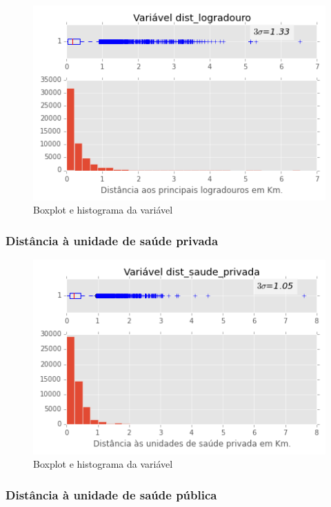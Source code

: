 \begin{figure}[H]
	\centering
	\includegraphics[width=0.8\linewidth]{img/var_dist_logradouro_boxhist}
	\caption{Boxplot e histograma da variável }
	\label{fig:var_dist_logradouro_boxhist}
\end{figure} 

\subsubsection{Distância à unidade de saúde privada}

\begin{figure}[H]
	\centering
	\includegraphics[width=0.8\linewidth]{img/var_dist_saude_privada_boxhist}
	\caption{Boxplot e histograma da variável }
	\label{fig:var_dist_saude_privada_boxhist}
\end{figure} 

\subsubsection{Distância à unidade de saúde pública}

